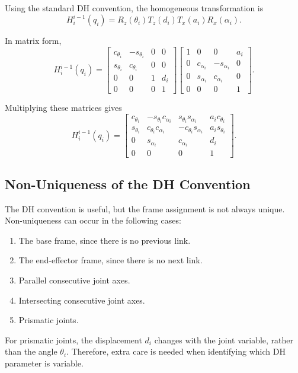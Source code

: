 \documentclass[../../master-handout.tex]{subfiles}
\begin{document}
Using the standard DH convention, the homogeneous transformation is
\[
    H_i^{i-1}(q_i)
    =
    R_z(\theta_i)T_z(d_i)T_x(a_i)R_x(\alpha_i).
\]

In matrix form,
\[
    H_i^{i-1}(q_i)
    =
    \begin{bmatrix}
        c_{\theta_i} & -s_{\theta_i} & 0 & 0 \\
        s_{\theta_i} & c_{\theta_i} & 0 & 0 \\
        0 & 0 & 1 & d_i \\
        0 & 0 & 0 & 1
    \end{bmatrix}
    \begin{bmatrix}
        1 & 0 & 0 & a_i \\
        0 & c_{\alpha_i} & -s_{\alpha_i} & 0 \\
        0 & s_{\alpha_i} & c_{\alpha_i} & 0 \\
        0 & 0 & 0 & 1
    \end{bmatrix}.
\]

Multiplying these matrices gives
\[
    H_i^{i-1}(q_i)
    =
    \begin{bmatrix}
        c_{\theta_i}
        & -s_{\theta_i}c_{\alpha_i}
        & s_{\theta_i}s_{\alpha_i}
        & a_i c_{\theta_i}
        \\
        s_{\theta_i}
        & c_{\theta_i}c_{\alpha_i}
        & -c_{\theta_i}s_{\alpha_i}
        & a_i s_{\theta_i}
        \\
        0
        & s_{\alpha_i}
        & c_{\alpha_i}
        & d_i
        \\
        0 & 0 & 0 & 1
    \end{bmatrix}.
\]

\subsection{Non-Uniqueness of the DH Convention}

The DH convention is useful, but the frame assignment is not always unique. Non-uniqueness can occur in the following cases:

\begin{enumerate}
    \item The base frame, since there is no previous link.
    \item The end-effector frame, since there is no next link.
    \item Parallel consecutive joint axes.
    \item Intersecting consecutive joint axes.
    \item Prismatic joints.
\end{enumerate}


For prismatic joints, the displacement \(d_i\) changes with the joint variable, rather than the angle \(\theta_i\). Therefore, extra care is needed when identifying which DH parameter is variable.
\end{document}

